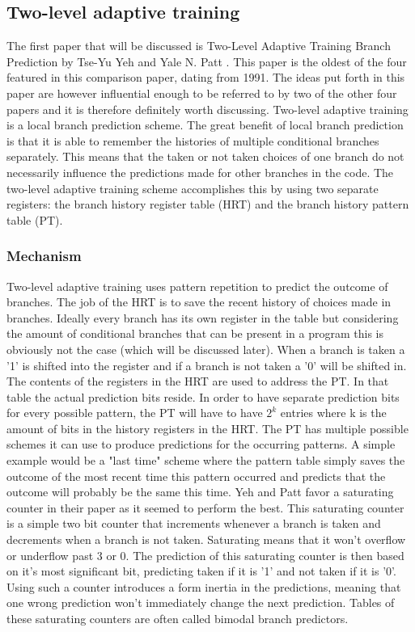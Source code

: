 \subsection{Two-level adaptive training}
The first paper that will be discussed is Two-Level Adaptive Training Branch Prediction by Tse-Yu Yeh and Yale N.
Patt \cite{twolevel}.
This paper is the oldest of the four featured in this comparison paper, dating from 1991.
The ideas put forth in this paper are however influential enough to be referred to by two of the other four papers and it is therefore definitely worth discussing.
Two-level adaptive training is a local branch prediction scheme.
The great benefit of local branch prediction is that it is able to remember the histories of multiple conditional branches separately.
This means that the taken or not taken choices of one branch do not necessarily influence the predictions made for other branches in the code.
The two-level adaptive training scheme accomplishes this by using two separate registers: the branch history register table (HRT) and the branch history pattern table (PT).
\subsubsection{Mechanism}
Two-level adaptive training uses pattern repetition to predict the outcome of branches.
The job of the HRT is to save the recent history of choices made in branches.
Ideally every branch has its own register in the table but considering the amount of conditional branches that can be present in a program this is obviously not the case (which will be discussed later).
When a branch is taken a '1' is shifted into the register and if a branch is not taken a '0' will be shifted in.
The contents of the registers in the HRT are used to address the PT.
In that table the actual prediction bits reside.
In order to have separate prediction bits for every possible pattern, the PT will have to have $2^k$ entries where k is the amount of bits in the history registers in the HRT.
The PT has multiple possible schemes it can use to produce predictions for the occurring patterns.
A simple example would be a "last time" scheme where the pattern table simply saves the outcome of the most recent time this pattern occurred and predicts that the outcome will probably be the same this time.
Yeh and Patt favor a saturating counter in their paper as it seemed to perform the best.
This saturating counter is a simple two bit counter that increments whenever a branch is taken and decrements when a branch is not taken.
Saturating means that it won't overflow or underflow past 3 or 0.
The prediction of this saturating counter is then based on it's most significant bit, predicting taken if it is '1' and not taken if it is '0'.
Using such a counter introduces a form inertia in the predictions, meaning that one wrong prediction won't immediately change the next prediction.
Tables of these saturating counters are often called bimodal branch predictors.
